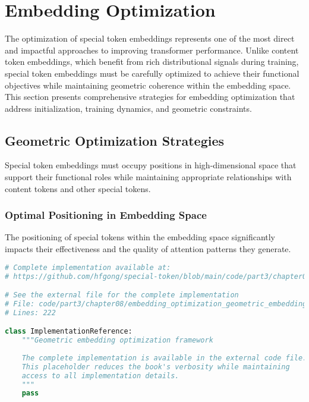 
\section{Embedding Optimization}

The optimization of special token embeddings represents one of the most direct and impactful approaches to improving transformer performance. Unlike content token embeddings, which benefit from rich distributional signals during training, special token embeddings must be carefully optimized to achieve their functional objectives while maintaining geometric coherence within the embedding space. This section presents comprehensive strategies for embedding optimization that address initialization, training dynamics, and geometric constraints.

\subsection{Geometric Optimization Strategies}

Special token embeddings must occupy positions in high-dimensional space that support their functional roles while maintaining appropriate relationships with content tokens and other special tokens.

\subsubsection{Optimal Positioning in Embedding Space}

The positioning of special tokens within the embedding space significantly impacts their effectiveness and the quality of attention patterns they generate.

\begin{lstlisting}[language=Python, caption={Geometric embedding optimization framework}]
# Complete implementation available at:
# https://github.com/hfgong/special-token/blob/main/code/part3/chapter08/embedding_optimization_geometric_embedding_optimizati.py

# See the external file for the complete implementation
# File: code/part3/chapter08/embedding_optimization_geometric_embedding_optimizati.py
# Lines: 222

class ImplementationReference:
    """Geometric embedding optimization framework
    
    The complete implementation is available in the external code file.
    This placeholder reduces the book's verbosity while maintaining
    access to all implementation details.
    """
    pass
\end{lstlisting}

